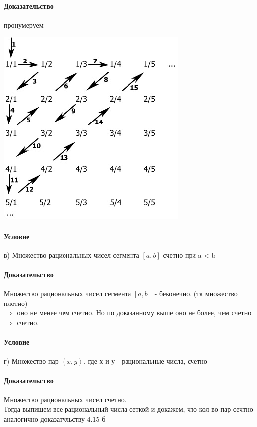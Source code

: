 \documentclass[a4paper,12pt]{article}
\begin{document}
\paragraph*{Доказательство}
пронумеруем\\
\begin{center}
  \includegraphics[scale=0.5]{image008.jpg}
\end{center}
\paragraph*{Условие}
в) Множество рациональных чисел сегмента $\left[ a, b\right] $ счетно при a < b
\paragraph*{Доказательство}
Множество рациональных чисел сегмента $\left[ a, b\right] $ - беконечно. (тк множество плотно)\\
$\Rightarrow$ оно не менее чем счетно. Но по доказанному выше оно не более, чем счетно $\Rightarrow$ счетно.
\paragraph*{Условие}
г) Множество пар $ \left\langle  x, y \right\rangle $, где х и у - рациональные числа, счетно
\paragraph*{Доказательство}
Множество рациональных чисел счетно.\\
Тогда выпишем все рациональный числа сеткой и докажем, что кол-во пар сечтно аналогично доказатульству 4.15 б\\
\end{document}

